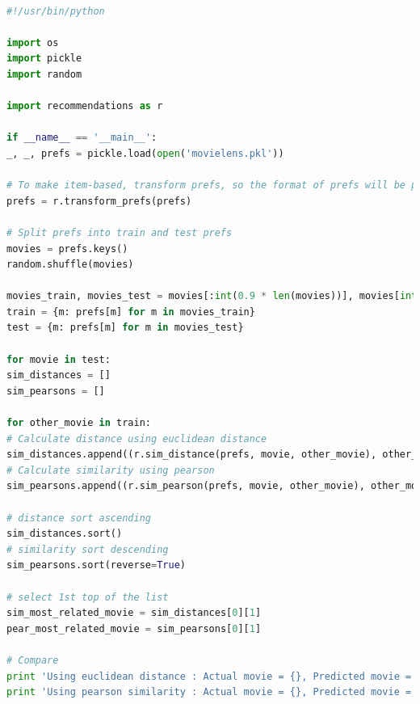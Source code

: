\documentclass[letterpaper,11pt]{article}
\begin{document}
\begin{lstlisting}[language=python, caption={Code for question 10.9}, label={lst:10_9}]

#!/usr/bin/python

import os
import pickle
import random

import recommendations as r

if __name__ == '__main__':
_, _, prefs = pickle.load(open('movielens.pkl'))

# To make item-based, transform prefs, so the format of prefs will be prefs[movie][user] = rating
prefs = r.transform_prefs(prefs)

# Split prefs into train and test prefs
movies = prefs.keys()
random.shuffle(movies)

movies_train, movies_test = movies[:int(0.9 * len(movies))], movies[int(0.1 * len(movies)):]
train = {m: prefs[m] for m in movies_train}
test = {m: prefs[m] for m in movies_test}

for movie in test:
sim_distances = []
sim_pearsons = []

for other_movie in train:
# Calculate distance using euclidean distance
sim_distances.append((r.sim_distance(prefs, movie, other_movie), other_movie))
# Calculate similarity using pearson
sim_pearsons.append((r.sim_pearson(prefs, movie, other_movie), other_movie))

# distance sort ascending
sim_distances.sort()
# similarity sort descending
sim_pearsons.sort(reverse=True)

# select 1st top of the list
sim_most_related_movie = sim_distances[0][1]
pear_most_related_movie = sim_pearsons[0][1]

# Compare
print 'Using euclidean distance : Actual movie = {}, Predicted movie = {}'.format(movie, sim_most_related_movie)
print 'Using pearson similarity : Actual movie = {}, Predicted movie = {}'.format(movie, pear_most_related_movie)


\end{lstlisting}

\noindent\makebox[\linewidth]{\rule{\textwidth}{0.4pt}}


\medskip


\end{document}

